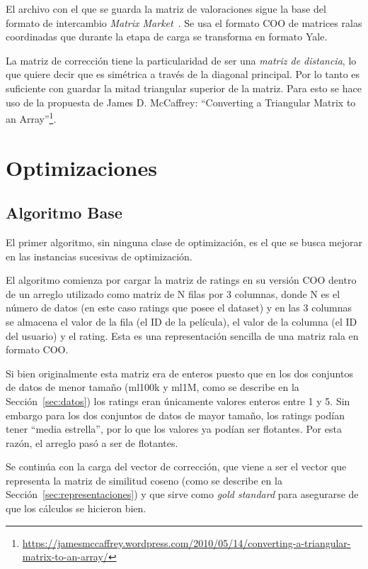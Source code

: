 \documentclass[11pt, a4paper]{article}
\begin{document}
  El archivo con el que se guarda la matriz de valoraciones sigue la base del
  formato de intercambio {\em Matrix Market}~\cite{Boisvert:aa}. Se usa el
  formato COO de matrices ralas coordinadas que durante la etapa de carga se
  transforma en formato Yale. 

  La matriz de corrección tiene la particularidad de ser una {\em matriz de
  distancia}, lo que quiere decir que es simétrica a través de la diagonal
  principal. Por lo tanto es suficiente con guardar la mitad triangular
  superior de la matriz. Para esto se hace uso de la propuesta de James D.
  McCaffrey: ``Converting a Triangular Matrix to an
  Array''\footnote{\url{https://jamesmccaffrey.wordpress.com/2010/05/14/converting-a-triangular-matrix-to-an-array/}}.

  \section{Optimizaciones}\label{sec:optimizaciones}

  \subsection{Algoritmo Base}

  El primer algoritmo, sin ninguna clase de optimización, es el que se busca
  mejorar en las instancias sucesivas de optimización.

  El algoritmo comienza por cargar la matriz de ratings en su versión COO
  dentro de un arreglo utilizado como matriz de N filas por 3 columnas, donde N
  es el número de datos (en este caso ratings que posee el dataset) y en las 3
  columnas se almacena el valor de la fila (el ID de la película), el valor de
  la columna (el ID del usuario) y el rating. Esta es una representación
  sencilla de una matriz rala en formato COO.

  Si bien originalmente esta matriz era de enteros puesto que en los dos
  conjuntos de datos de menor tamaño (ml100k y ml1M, como se describe en la
  Sección~\ref{sec:datos}) los ratings eran únicamente valores enteros entre 1 y
  5. Sin embargo para los dos conjuntos de datos de mayor tamaño, los ratings
  podían tener ``media estrella'', por lo que los valores ya podían ser
  flotantes. Por esta razón, el arreglo pasó a ser de flotantes. 

  Se continúa con la carga del vector de corrección, que viene a ser el vector
  que representa la matriz de similitud coseno (como se describe en la
  Sección~\ref{sec:representaciones}) y que sirve como {\em gold standard} para
  asegurarse de que los cálculos se hicieron bien.
\end{document}
